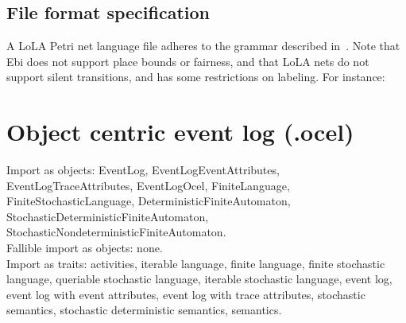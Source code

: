 {\subsection*{File format specification}A LoLA Petri net language file adheres to the grammar described in~\cite{DBLP:conf/apn/Wolf18a}.
    Note that Ebi does not support place bounds or fairness, and that LoLA nets do not support silent transitions, and has some restrictions on labeling.
For instance:
    
\clearpage
\section{Object centric event log (.ocel)}
\label{filehandler:object-centric event log}
Import as objects: EventLog, EventLogEventAttributes, EventLogTraceAttributes, EventLogOcel, FiniteLanguage, FiniteStochasticLanguage, DeterministicFiniteAutomaton, StochasticDeterministicFiniteAutomaton, StochasticNondeterministicFiniteAutomaton.
\\Fallible import as objects: none.
\\Import as traits: activities, iterable language, finite language, finite stochastic language, queriable stochastic language, iterable stochastic language, event log, event log with event attributes, event log with trace attributes, stochastic semantics, stochastic deterministic semantics, semantics.
}
